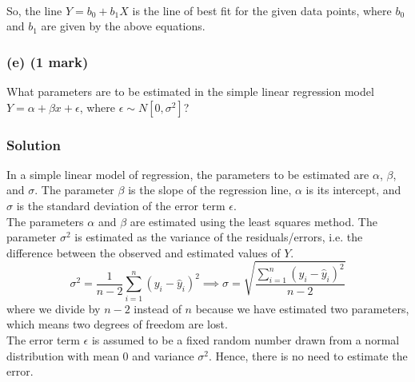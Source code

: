 \documentclass[12pt]{article}
\begin{document}
    \vspace*{5pt} \\
    So, the line $Y = b_{0} + b_{1} X$ is the line of best fit for the given data points, where $b_{0}$ and $b_{1}$ are given
    by the above equations.

    \subsubsection*{(e) (1 mark)}
    What parameters are to be estimated in the simple linear regression model $Y = \alpha + \beta x + \epsilon$, where
    $\epsilon \sim N[0, \sigma^{2}]$?

    \subsubsection*{Solution}
    In a simple linear model of regression, the parameters to be estimated are $\alpha$, $\beta$, and $\sigma$. The parameter
    $\beta$ is the slope of the regression line, $\alpha$ is its intercept, and $\sigma$ is the standard
    deviation of the error term $\epsilon$.
    \vspace*{5pt} \\
    The parameters $\alpha$ and $\beta$ are estimated using the least squares method. The parameter $\sigma^{2}$ is estimated as
    the variance of the residuals/errors, i.e. the difference between the observed and estimated values of $Y$.
    \begin{equation}
        \sigma^{2} = \frac{1}{n-2} \sum_{i=1}^{n} (y_{i} - \hat{y}_{i})^{2} \implies
        \sigma = \sqrt{\frac{\sum_{i=1}^{n} (y_{i} - \hat{y}_{i})^{2}}{n - 2}}
    \end{equation}
    where we divide by $n - 2$ instead of $n$ because we have estimated two parameters, which means two degrees of freedom are lost.
    \vspace*{5pt} \\
    The error term $\epsilon$ is assumed to be a fixed random number drawn from a normal distribution with mean $0$ and
    variance $\sigma^{2}$. Hence, there is no need to estimate the error.
\end{document}
